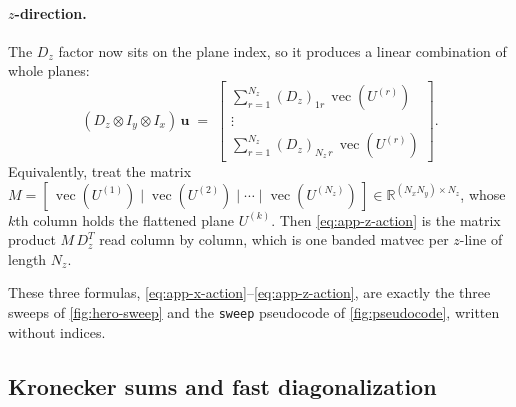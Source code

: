\documentclass[11pt]{article}
\newcommand{\kron}{\otimes}
\newcommand{\Dz}{D_{z}}
\newcommand{\Ix}{I_{x}}
\newcommand{\Iy}{I_{y}}
\newcommand{\R}{\mathbb{R}}
\newcommand{\vect}{\operatorname{vec}}
\begin{document}
\begin{appendices}
\paragraph{$z$-direction.}
The $\Dz$ factor now sits on the plane index, so it produces a linear
combination of whole planes:
\begin{equation}
\label{eq:app-z-action}
  (\Dz \kron \Iy \kron \Ix)\,\bm{u}
  \;=\;
  \begin{bmatrix}
    \sum_{r=1}^{N_z} (\Dz)_{1 r}\,\vect(U^{(r)}) \\[2pt]
    \vdots \\[2pt]
    \sum_{r=1}^{N_z} (\Dz)_{N_z\, r}\,\vect(U^{(r)})
  \end{bmatrix}.
\end{equation}
Equivalently, treat the matrix
$M = [\,\vect(U^{(1)}) \mid \vect(U^{(2)}) \mid \cdots \mid \vect(U^{(N_z)})\,]
\in \R^{(N_x N_y) \times N_z}$,
whose $k$th column holds the flattened plane $U^{(k)}$.  Then
\eqref{eq:app-z-action} is the matrix product $M\,\Dz^T$ read column
by column, which is one banded matvec per $z$-line of length $N_z$.

These three formulas, \eqref{eq:app-x-action}--\eqref{eq:app-z-action},
are exactly the three sweeps of \cref{fig:hero-sweep} and the
\texttt{sweep} pseudocode of \cref{fig:pseudocode}, written without
indices.

\subsection{Kronecker sums and fast diagonalization}
\label{app:fast-diag-derivation}


\end{appendices}
\end{document}
